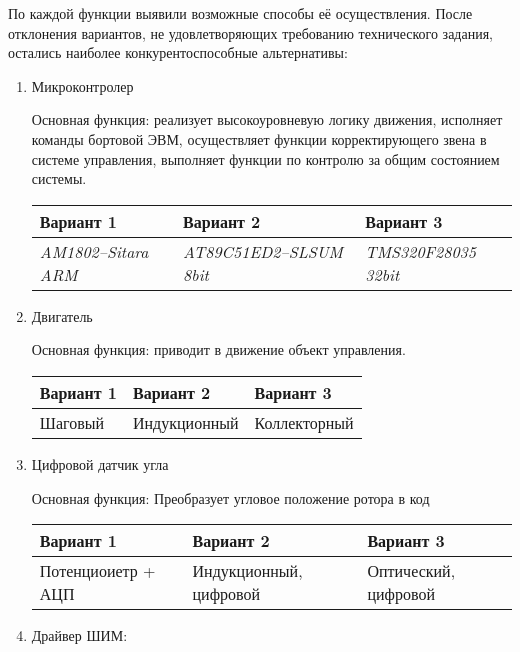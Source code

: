 По каждой функции выявили возможные способы её осуществления.
После отклонения вариантов, не удовлетворяющих требованию технического
задания, остались наиболее конкурентоспособные альтернативы:

\begin{enumerate}
    \item Микроконтролер

        Основная функция: реализует высокоуровневую логику движения,
        исполняет команды бортовой ЭВМ, осуществляет функции корректирующего
        звена в системе управления, выполняет функции по контролю за общим
        состоянием системы.

        \begin{tabular}{|p{3.5cm}|p{3.5cm}|p{3.5cm}|}
            \hline
            Вариант 1 & Вариант 2 & Вариант 3 \\
            \hline
            \textit{AM1802--Sitara ARM} &
            \textit{AT89C51ED2--SLSUM 8bit} &
            \textit{TMS320F28035 32bit} \\
            \hline
        \end{tabular}

    \item Двигатель

        Основная функция: приводит в движение объект управления.

        \begin{tabular}{|p{3.5cm}|p{3.5cm}|p{3.5cm}|}
            \hline
            Вариант 1 & Вариант 2 & Вариант 3 \\
            \hline
            Шаговый &
            Индукционный &
            Коллекторный \\
            \hline
        \end{tabular}

    \item Цифровой датчик угла

        Основная функция: Преобразует угловое положение ротора в код

        \begin{tabular}{|p{3.5cm}|p{3.5cm}|p{3.5cm}|}
            \hline
            Вариант 1 & Вариант 2 & Вариант 3 \\
            \hline
            Потенциоиетр + АЦП &
            Индукционный, цифровой &
            Оптический, цифровой \\
            \hline
        \end{tabular}

    \item Драйвер ШИМ:


\end{enumerate}
